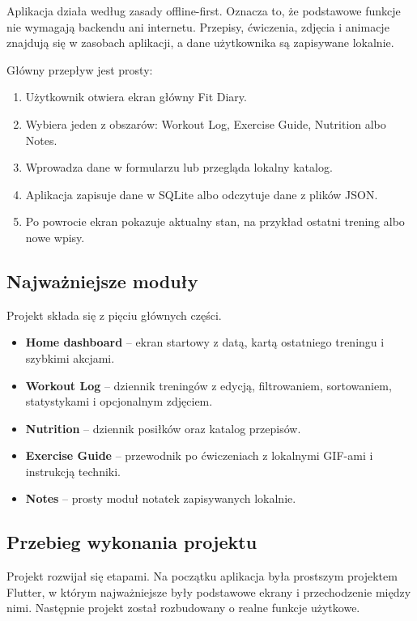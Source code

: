 \documentclass[12pt,a4paper]{article}
\begin{document}
Aplikacja działa według zasady offline-first. Oznacza to, że podstawowe funkcje nie wymagają backendu ani internetu. Przepisy, ćwiczenia, zdjęcia i animacje znajdują się w zasobach aplikacji, a dane użytkownika są zapisywane lokalnie.

Główny przepływ jest prosty:

\begin{enumerate}
    \item Użytkownik otwiera ekran główny Fit Diary.
    \item Wybiera jeden z obszarów: Workout Log, Exercise Guide, Nutrition albo Notes.
    \item Wprowadza dane w formularzu lub przegląda lokalny katalog.
    \item Aplikacja zapisuje dane w SQLite albo odczytuje dane z plików JSON.
    \item Po powrocie ekran pokazuje aktualny stan, na przykład ostatni trening albo nowe wpisy.
\end{enumerate}

\subsection{Najważniejsze moduły}

Projekt składa się z pięciu głównych części.

\begin{itemize}
    \item \textbf{Home dashboard} -- ekran startowy z datą, kartą ostatniego treningu i szybkimi akcjami.
    \item \textbf{Workout Log} -- dziennik treningów z edycją, filtrowaniem, sortowaniem, statystykami i opcjonalnym zdjęciem.
    \item \textbf{Nutrition} -- dziennik posiłków oraz katalog przepisów.
    \item \textbf{Exercise Guide} -- przewodnik po ćwiczeniach z lokalnymi GIF-ami i instrukcją techniki.
    \item \textbf{Notes} -- prosty moduł notatek zapisywanych lokalnie.
\end{itemize}

\subsection{Przebieg wykonania projektu}

Projekt rozwijał się etapami. Na początku aplikacja była prostszym projektem Flutter, w którym najważniejsze były podstawowe ekrany i przechodzenie między nimi. Następnie projekt został rozbudowany o realne funkcje użytkowe.
\end{document}
